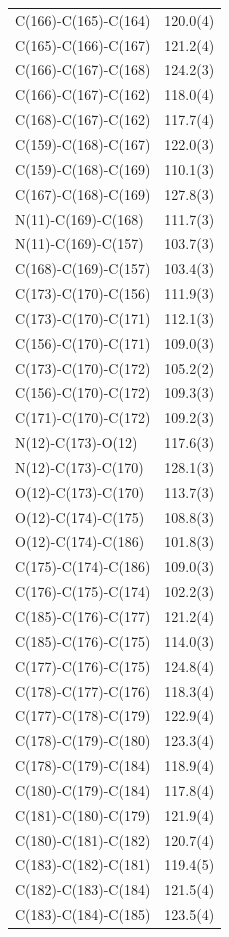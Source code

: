 \begin{center}
{\begin{supertabular}{p{1.5in}c}
C(166)-C(165)-C(164)&120.0(4)\\
C(165)-C(166)-C(167)&121.2(4)\\
C(166)-C(167)-C(168)&124.2(3)\\
C(166)-C(167)-C(162)&118.0(4)\\
C(168)-C(167)-C(162)&117.7(4)\\
C(159)-C(168)-C(167)&122.0(3)\\
C(159)-C(168)-C(169)&110.1(3)\\
C(167)-C(168)-C(169)&127.8(3)\\
N(11)-C(169)-C(168)&111.7(3)\\
N(11)-C(169)-C(157)&103.7(3)\\
C(168)-C(169)-C(157)&103.4(3)\\
C(173)-C(170)-C(156)&111.9(3)\\
C(173)-C(170)-C(171)&112.1(3)\\
C(156)-C(170)-C(171)&109.0(3)\\
C(173)-C(170)-C(172)&105.2(2)\\
C(156)-C(170)-C(172)&109.3(3)\\
C(171)-C(170)-C(172)&109.2(3)\\
N(12)-C(173)-O(12)&117.6(3)\\
N(12)-C(173)-C(170)&128.1(3)\\
O(12)-C(173)-C(170)&113.7(3)\\
O(12)-C(174)-C(175)&108.8(3)\\
O(12)-C(174)-C(186)&101.8(3)\\
C(175)-C(174)-C(186)&109.0(3)\\
C(176)-C(175)-C(174)&102.2(3)\\
C(185)-C(176)-C(177)&121.2(4)\\
C(185)-C(176)-C(175)&114.0(3)\\
C(177)-C(176)-C(175)&124.8(4)\\
C(178)-C(177)-C(176)&118.3(4)\\
C(177)-C(178)-C(179)&122.9(4)\\
C(178)-C(179)-C(180)&123.3(4)\\
C(178)-C(179)-C(184)&118.9(4)\\
C(180)-C(179)-C(184)&117.8(4)\\
C(181)-C(180)-C(179)&121.9(4)\\
C(180)-C(181)-C(182)&120.7(4)\\
C(183)-C(182)-C(181)&119.4(5)\\
C(182)-C(183)-C(184)&121.5(4)\\
C(183)-C(184)-C(185)&123.5(4)\\

\end{supertabular}}
\end{center}
